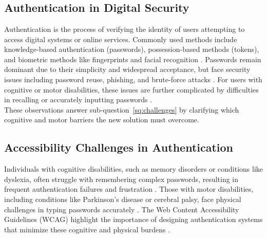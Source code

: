 \chapter{}%
\label{ch:stand-van-zaken}




\section{Authentication in Digital Security}
Authentication is the process of verifying the identity of users attempting to access digital systems or online services. 
Commonly used methods include knowledge-based authentication (passwords), possession-based methods (tokens), and 
biometric methods like fingerprints and facial recognition \autocite{Pant2022}. Passwords remain dominant due to 
their simplicity and widespread acceptance, but face security issues including password reuse, phishing, and 
brute-force attacks \autocite{Ophoff2021}. For users with cognitive or motor disabilities, these issues are 
further complicated by difficulties in recalling or accurately inputting passwords \autocite{Rochford2014}.\\
These observations answer sub-question~\ref{sq:challenges} by clarifying which
cognitive and motor barriers the new solution must overcome.


\section{Accessibility Challenges in Authentication}
Individuals with cognitive disabilities, such as memory disorders or conditions like dyslexia, often struggle with remembering complex passwords, resulting in frequent authentication failures and frustration \autocite{Farid2019, Ophoff2021}. Those with motor disabilities, including conditions like Parkinson's disease or cerebral palsy, face physical challenges in typing passwords accurately \autocite{Renaud2020}. The Web Content Accessibility Guidelines (WCAG) highlight the importance of designing authentication systems that minimize these cognitive and physical burdens \autocite{Brewer2023}.

